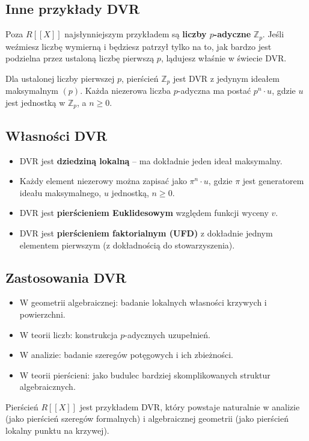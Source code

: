\subsection*{Inne przykłady DVR}

Poza \( R[[X]] \) najsłynniejszym przykładem są \textbf{liczby \( p \)-adyczne} \( \mathbb{Z}_p \). Jeśli weźmiesz liczbę wymierną i będziesz patrzył tylko na to, jak bardzo jest podzielna przez ustaloną liczbę pierwszą \( p \), lądujesz właśnie w świecie DVR.

\begin{eg}
Dla ustalonej liczby pierwszej \( p \), pierścień \( \mathbb{Z}_p \) jest DVR z jedynym ideałem maksymalnym \( (p) \). Każda niezerowa liczba \( p \)-adyczna ma postać \( p^n \cdot u \), gdzie \( u \) jest jednostką w \( \mathbb{Z}_p \), a \( n \geq 0 \).
\end{eg}

\subsection*{Własności DVR}

\begin{itemize}
    \item DVR jest \textbf{dziedziną lokalną} – ma dokładnie jeden ideał maksymalny.
    \item Każdy element niezerowy można zapisać jako \( \pi^n \cdot u \), gdzie \( \pi \) jest generatorem ideału maksymalnego, \( u \) jednostką, \( n \geq 0 \).
    \item DVR jest \textbf{pierścieniem Euklidesowym} względem funkcji wyceny \( v \).
    \item DVR jest \textbf{pierścieniem faktorialnym (UFD)} z dokładnie jednym elementem pierwszym (z dokładnością do stowarzyszenia).
\end{itemize}

\subsection*{Zastosowania DVR}

\begin{itemize}
    \item W geometrii algebraicznej: badanie lokalnych własności krzywych i powierzchni.
    \item W teorii liczb: konstrukcja \( p \)-adycznych uzupełnień.
    \item W analizie: badanie szeregów potęgowych i ich zbieżności.
    \item W teorii pierścieni: jako budulec bardziej skomplikowanych struktur algebraicznych.
\end{itemize}

\begin{remark}
Pierścień \( R[[X]] \) jest przykładem DVR, który powstaje naturalnie w analizie (jako pierścień szeregów formalnych) i algebraicznej geometrii (jako pierścień lokalny punktu na krzywej).
\end{remark}

